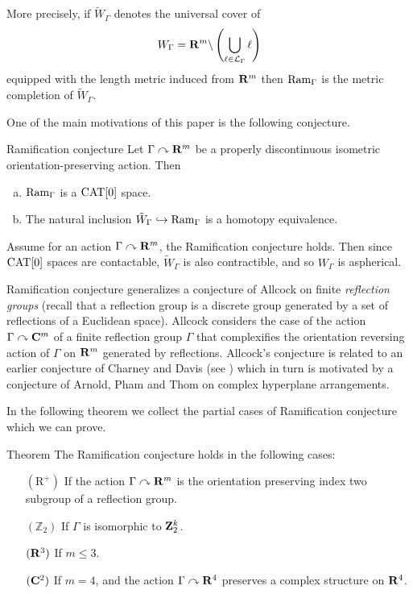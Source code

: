 \documentclass{compositio}
\begin{document}
More precisely, if $\tilde W_\Gamma$ denotes the universal cover of
$$W_\Gamma=\mathbf{R}^m\backslash
\left(\bigcup_{\ell\in\mathcal{L}_\Gamma}\ell\right)$$
equipped with the length metric induced from $\mathbf{R}^m$
then $\mathop{\rm Ram}\nolimits_\Gamma$ is the metric completion of $\tilde W_\Gamma$.

One of the main motivations of this paper is the following conjecture.

\begin{thm}{Ramification conjecture}\label{mainconjecture}
Let $\Gamma\curvearrowright\mathbf{R}^m$ be a properly discontinuous isometric orientation-preserving action.
Then
\begin{enumerate}[a)]
\item $\mathop{\rm Ram}\nolimits_\Gamma$ is a $\mathrm{CAT}[0]$ space.
\item The natural inclusion
$\tilde W_\Gamma\hookrightarrow \mathop{\rm Ram}\nolimits_\Gamma$ is a homotopy equivalence.
\end{enumerate}

\end{thm}

Assume for an action $\Gamma\curvearrowright\mathbf{R}^m$, the Ramification conjecture holds. 
Then since $\mathrm{CAT}[0]$ spaces are contactable,
$\tilde W_\Gamma$ is also contractible,
and so $W_\Gamma$ is aspherical.

Ramification conjecture generalizes a conjecture of Allcock  \cite[Conjecture 1.4]{allcock} on finite \emph{reflection groups} (recall that a reflection group is a discrete group generated by a set of reflections of a Euclidean space). Allcock considers the case of the action $\Gamma\curvearrowright\mathbf{C}^m$ of a finite reflection group $\Gamma$ that complexifies the  orientation reversing action of $\Gamma$ on $\mathbf{R}^m$ generated by reflections. 
Allcock's conjecture is related to an earlier conjecture of Charney and Davis (see \cite[Conjecture 3]{charney-davis-95}) which in turn is motivated by a conjecture of Arnold, Pham and Thom on complex hyperplane  arrangements.

In the following theorem we collect the partial cases of Ramification conjecture which we can prove. 

\begin{thm}{Theorem}\label{thm:main}
The Ramification conjecture holds in the following cases:
\begin{itemize}
\item[$(\mathrm{R}^+)$] If the action $\Gamma\curvearrowright\mathbf{R}^m$ is the orientation preserving index two subgroup of a reflection group.
\item[$(\mathbb{Z}_2)$] If $\Gamma$ is isomorphic to $\mathbf{Z}_2^k$.
\item[$(\mathbf{R}^3)$]\label{3} If $m\le 3$.
\item[$(\mathbf{C}^2)$]\label{4}
If $m=4$, and the action $\Gamma\curvearrowright\mathbf{R}^4$
preserves a complex structure on $\mathbf{R}^4$.
\end{itemize}

\end{thm}
\end{document}
